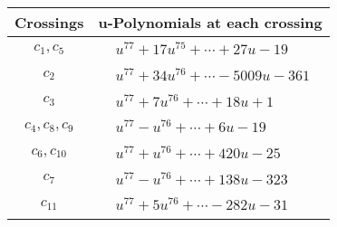 \documentclass[1p]{elsarticle_modified}
\theoremstyle{definition}
\begin{document}
\begin{tabular}{m{50pt}|m{274pt}}
Crossings & \hspace{64pt}u-Polynomials at each crossing \\
\hline $$\begin{aligned}c_{1},c_{5}\end{aligned}$$&$\begin{aligned}
&u^{77}+17 u^{75}+\cdots+27 u-19
\end{aligned}$\\
\hline $$\begin{aligned}c_{2}\end{aligned}$$&$\begin{aligned}
&u^{77}+34 u^{76}+\cdots-5009 u-361
\end{aligned}$\\
\hline $$\begin{aligned}c_{3}\end{aligned}$$&$\begin{aligned}
&u^{77}+7 u^{76}+\cdots+18 u+1
\end{aligned}$\\
\hline $$\begin{aligned}c_{4},c_{8},c_{9}\end{aligned}$$&$\begin{aligned}
&u^{77}- u^{76}+\cdots+6 u-19
\end{aligned}$\\
\hline $$\begin{aligned}c_{6},c_{10}\end{aligned}$$&$\begin{aligned}
&u^{77}+u^{76}+\cdots+420 u-25
\end{aligned}$\\
\hline $$\begin{aligned}c_{7}\end{aligned}$$&$\begin{aligned}
&u^{77}- u^{76}+\cdots+138 u-323
\end{aligned}$\\
\hline $$\begin{aligned}c_{11}\end{aligned}$$&$\begin{aligned}
&u^{77}+5 u^{76}+\cdots-282 u-31
\end{aligned}$\\
\hline
\end{tabular}\\~\\
\newpage\renewcommand{\arraystretch}{1}
\end{document}
